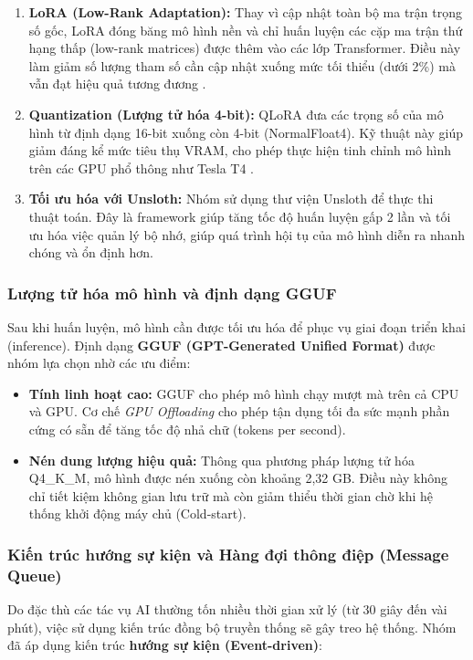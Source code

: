 \begin{enumerate}
    \item \textbf{LoRA (Low-Rank Adaptation):} Thay vì cập nhật toàn bộ ma trận trọng số gốc, LoRA đóng băng mô hình nền và chỉ huấn luyện các cặp ma trận thứ hạng thấp (low-rank matrices) được thêm vào các lớp Transformer. Điều này làm giảm số lượng tham số cần cập nhật xuống mức tối thiểu (dưới 2\%) mà vẫn đạt hiệu quả tương đương \cite{lora_hu}.
    \item \textbf{Quantization (Lượng tử hóa 4-bit):} QLoRA đưa các trọng số của mô hình từ định dạng 16-bit xuống còn 4-bit (NormalFloat4). Kỹ thuật này giúp giảm đáng kể mức tiêu thụ VRAM, cho phép thực hiện tinh chỉnh mô hình trên các GPU phổ thông như Tesla T4 \cite{qlora}.
    \item \textbf{Tối ưu hóa với Unsloth:} Nhóm sử dụng thư viện Unsloth để thực thi thuật toán. Đây là framework giúp tăng tốc độ huấn luyện gấp 2 lần và tối ưu hóa việc quản lý bộ nhớ, giúp quá trình hội tụ của mô hình diễn ra nhanh chóng và ổn định hơn.
\end{enumerate}

\subsubsection{Lượng tử hóa mô hình và định dạng GGUF}
Sau khi huấn luyện, mô hình cần được tối ưu hóa để phục vụ giai đoạn triển khai (inference). Định dạng \textbf{GGUF (GPT-Generated Unified Format)} được nhóm lựa chọn nhờ các ưu điểm:
\begin{itemize}
    \item \textbf{Tính linh hoạt cao:} GGUF cho phép mô hình chạy mượt mà trên cả CPU và GPU. Cơ chế \textit{GPU Offloading} cho phép tận dụng tối đa sức mạnh phần cứng có sẵn để tăng tốc độ nhả chữ (tokens per second).
    \item \textbf{Nén dung lượng hiệu quả:} Thông qua phương pháp lượng tử hóa Q4\_K\_M, mô hình được nén xuống còn khoảng 2,32 GB. Điều này không chỉ tiết kiệm không gian lưu trữ mà còn giảm thiểu thời gian chờ khi hệ thống khởi động máy chủ (Cold-start).
\end{itemize}

\subsubsection{Kiến trúc hướng sự kiện và Hàng đợi thông điệp (Message Queue)}
Do đặc thù các tác vụ AI thường tốn nhiều thời gian xử lý (từ 30 giây đến vài phút), việc sử dụng kiến trúc đồng bộ truyền thống sẽ gây treo hệ thống. Nhóm đã áp dụng kiến trúc \textbf{hướng sự kiện (Event-driven)}:

